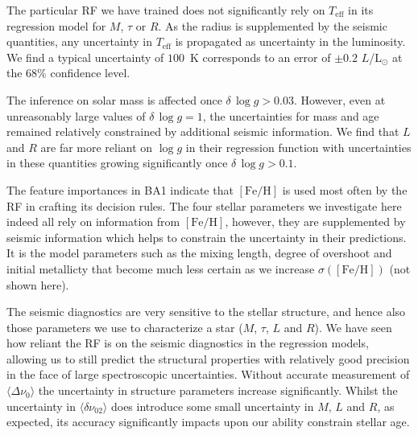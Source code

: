 The particular RF we have trained does not significantly rely on $T_{\text{eff}}$ in its regression model for $M$, $\tau$ or $R$. As the radius is supplemented by the seismic quantities, any uncertainty in $T_{\text{eff}}$ is propagated as uncertainty in the luminosity. We find a typical uncertainty of $100$~K corresponds to an error of ${\pm 0.2}$ $L$/L$_{\odot}$ at the $68\%$ confidence level.

The inference on solar mass is affected once ${\delta \, \log{} g > 0.03}$. 
However, even at unreasonably large values of  ${\delta \, \log{} g = 1}$, the uncertainties for mass and age remained relatively constrained by additional seismic information. We find 
that $L$ and $R$ are far more reliant on ${\log{} g}$ in their regression function with uncertainties in these quantities growing significantly once  ${\delta \, \log{} g > 0.1}$.

The feature importances in BA1 indicate that ${[\text{Fe/H}]}$ is used most often by the RF in  crafting its decision rules.  The four stellar parameters we investigate here indeed all rely on information from ${[\text{Fe/H}]}$, however, they are supplemented by seismic information which helps to constrain the uncertainty in their predictions. It is the model parameters such as the mixing length, degree of overshoot and initial metallicty  that become much less certain as we increase ${\sigma([\text{Fe/H}])}$ (not shown here).  

 

The seismic diagnostics are very sensitive to the stellar structure, and hence also those  parameters we use to characterize a star ($M$, $\tau$, $L$ and $R$). We have seen how reliant the RF is on the seismic diagnostics in the  regression models, allowing us to still predict the structural properties with relatively good precision in the face of large spectroscopic uncertainties. Without accurate measurement of ${\langle\Delta\nu_0\rangle}$ the uncertainty in structure parameters increase significantly. Whilst the uncertainty in ${\langle\delta\nu_{02}\rangle}$ does introduce some small uncertainty in $M$, $L$ and $R$, as expected, its accuracy significantly impacts upon our ability constrain stellar age. 






